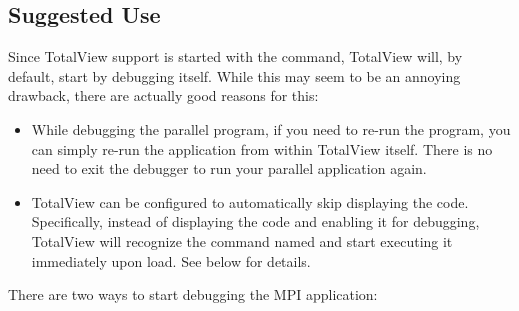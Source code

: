 
\subsection{Suggested Use}

Since TotalView support is started with the  command,
TotalView will, by default, start by debugging  itself.
While this may seem to be an annoying drawback, there are actually
good reasons for this:

\begin{itemize}
\item While debugging the parallel program, if you need to re-run the
  program, you can simply re-run the application from within TotalView
  itself.  There is no need to exit the debugger to run your parallel
  application again.
  
\item TotalView can be configured to automatically skip displaying the
   code.  Specifically, instead of displaying the
   code and enabling it for debugging, TotalView will
  recognize the command named  and start executing it
  immediately upon load.  See below for details.
\end{itemize}

\noindent There are two ways to start debugging the MPI application:


